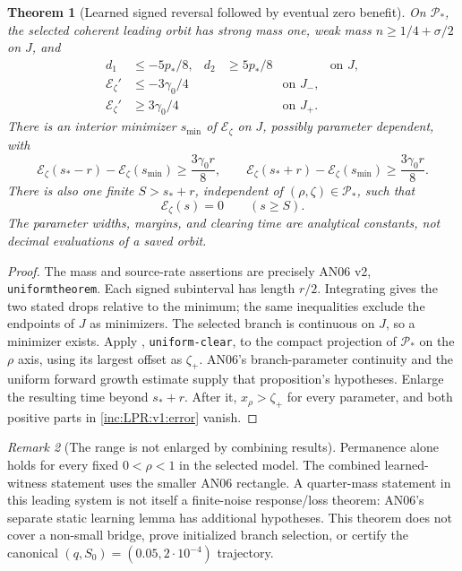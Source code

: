 \documentclass[11pt]{article}
\numberwithin{equation}{section}
\newtheorem{theorem}{Theorem}[section]
\theoremstyle{remark}\newtheorem{remark}[theorem]{Remark}
\begin{document}
\begin{theorem}[Learned signed reversal followed by eventual zero benefit]
\label{inc:LPR:v1:combinedtheorem}
On $\mathcal P_*$, the selected coherent leading orbit has strong mass one,
weak mass $n\ge1/4+\sigma/2$ on $J$, and
\begin{align}
 d_1&\le-5p_*/8, &d_2&\ge5p_*/8 &&\text{on }J,\nonumber\\
 \mathcal E_\zeta'&\le-3\gamma_0/4&&&\text{on }J_-,\nonumber\\
 \mathcal E_\zeta'&\ge3\gamma_0/4&&&\text{on }J_+.
 \label{inc:LPR:v1:combinedmargins}
\end{align}
There is an interior minimizer $s_{\min}$ of $\mathcal E_\zeta$ on $J$,
possibly parameter dependent, with
\[
 \mathcal E_\zeta(s_*-r)-\mathcal E_\zeta(s_{\min})
 \ge\frac{3\gamma_0r}{8},\qquad
 \mathcal E_\zeta(s_*+r)-\mathcal E_\zeta(s_{\min})
 \ge\frac{3\gamma_0r}{8}.
\]
There is also one finite $S>s_*+r$, independent of $(\rho,\zeta)\in
\mathcal P_*$, such that
\[
 \mathcal E_\zeta(s)=0\qquad(s\ge S).
\]
The parameter widths, margins, and clearing time are analytical constants,
not decimal evaluations of a saved orbit.
\end{theorem}
\begin{proof}
The mass and source-rate assertions are precisely AN06 v2,
\texttt{uniformtheorem}. Each signed subinterval has length $r/2$.
Integrating gives the two stated drops relative to the minimum; the same
inequalities exclude the endpoints of $J$ as minimizers. The selected
branch is continuous on $J$, so a minimizer exists.
Apply \cite{LP}, \texttt{uniform-clear}, to the compact projection of
$\mathcal P_*$ on the $\rho$ axis, using its largest offset as $\zeta_+$.
AN06's branch-parameter continuity and the uniform forward growth estimate
supply that proposition's hypotheses. Enlarge the resulting time beyond
$s_*+r$. After it, $x_\rho>\zeta_+$ for every parameter, and both positive
parts in \eqref{inc:LPR:v1:error} vanish.
\end{proof}

\begin{remark}[The range is not enlarged by combining results]
Permanence alone holds for every fixed $0<\rho<1$ in the selected model.
The combined learned-witness statement uses the smaller AN06 rectangle.
A quarter-mass statement in this leading system is not itself a
finite-noise response/loss theorem: AN06's separate static learning lemma
has additional hypotheses. This theorem does not cover a non-small
bridge, prove initialized branch selection, or certify the canonical
$(q,S_0)=(0.05,2\cdot10^{-4})$ trajectory.
\end{remark}
\end{document}
